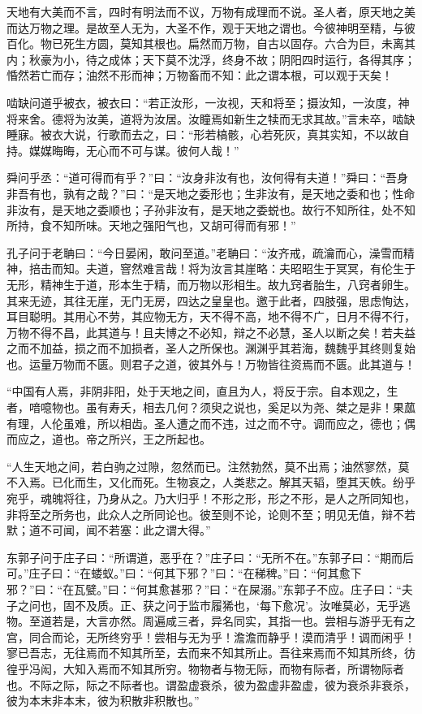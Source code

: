 \documentclass[]{article}
\begin{document}
天地有大美而不言，四时有明法而不议，万物有成理而不说。圣人者，原天地之美而达万物之理。是故至人无为，大圣不作，观于天地之谓也。今彼神明至精，与彼百化。物已死生方圆，莫知其根也。扁然而万物，自古以固存。六合为巨，未离其内；秋豪为小，待之成体；天下莫不沈浮，终身不故；阴阳四时运行，各得其序；惛然若亡而存；油然不形而神；万物畜而不知：此之谓本根，可以观于天矣！

啮缺问道乎被衣，被衣曰：``若正汝形，一汝视，天和将至；摄汝知，一汝度，神将来舍。德将为汝美，道将为汝居。汝瞳焉如新生之犊而无求其故。''言未卒，啮缺睡寐。被衣大说，行歌而去之，曰：``形若槁骸，心若死灰，真其实知，不以故自持。媒媒晦晦，无心而不可与谋。彼何人哉！''

舜问乎丞：``道可得而有乎？''曰：``汝身非汝有也，汝何得有夫道！''舜曰：``吾身非吾有也，孰有之哉？''曰：``是天地之委形也；生非汝有，是天地之委和也；性命非汝有，是天地之委顺也；子孙非汝有，是天地之委蜕也。故行不知所往，处不知所持，食不知所味。天地之强阳气也，又胡可得而有邪！''

孔子问于老聃曰：``今日晏闲，敢问至道。''老聃曰：``汝齐戒，疏瀹而心，澡雪而精神，掊击而知。夫道，窨然难言哉！将为汝言其崖略：夫昭昭生于冥冥，有伦生于无形，精神生于道，形本生于精，而万物以形相生。故九窍者胎生，八窍者卵生。其来无迹，其往无崖，无门无房，四达之皇皇也。邀于此者，四肢强，思虑恂达，耳目聪明。其用心不劳，其应物无方，天不得不高，地不得不广，日月不得不行，万物不得不昌，此其道与！且夫博之不必知，辩之不必慧，圣人以断之矣！若夫益之而不加益，损之而不加损者，圣人之所保也。渊渊乎其若海，魏魏乎其终则复始也。运量万物而不匮。则君子之道，彼其外与！万物皆往资焉而不匮。此其道与！

``中国有人焉，非阴非阳，处于天地之间，直且为人，将反于宗。自本观之，生者，喑噫物也。虽有寿夭，相去几何？须臾之说也，奚足以为尧、桀之是非！果蓏有理，人伦虽难，所以相齿。圣人遭之而不违，过之而不守。调而应之，德也；偶而应之，道也。帝之所兴，王之所起也。

``人生天地之间，若白驹之过隙，忽然而已。注然勃然，莫不出焉；油然寥然，莫不入焉。已化而生，又化而死。生物哀之，人类悲之。解其天韬，堕其天帙。纷乎宛乎，魂魄将往，乃身从之。乃大归乎！不形之形，形之不形，是人之所同知也，非将至之所务也，此众人之所同论也。彼至则不论，论则不至；明见无值，辩不若默；道不可闻，闻不若塞：此之谓大得。''

东郭子问于庄子曰：``所谓道，恶乎在？''庄子曰：``无所不在。''东郭子曰：``期而后可。''庄子曰：``在蝼蚁。''曰：``何其下邪？''曰：``在稊稗。''曰：``何其愈下邪？''曰：``在瓦甓。''曰：``何其愈甚邪？''曰：``在屎溺。''东郭子不应。庄子曰：``夫子之问也，固不及质。正、获之问于监市履狶也，`每下愈况'。汝唯莫必，无乎逃物。至道若是，大言亦然。周遍咸三者，异名同实，其指一也。尝相与游乎无有之宫，同合而论，无所终穷乎！尝相与无为乎！澹澹而静乎！漠而清乎！调而闲乎！寥已吾志，无往焉而不知其所至，去而来不知其所止。吾往来焉而不知其所终，彷徨乎冯闳，大知入焉而不知其所穷。物物者与物无际，而物有际者，所谓物际者也。不际之际，际之不际者也。谓盈虚衰杀，彼为盈虚非盈虚，彼为衰杀非衰杀，彼为本末非本末，彼为积散非积散也。''
\end{document}
